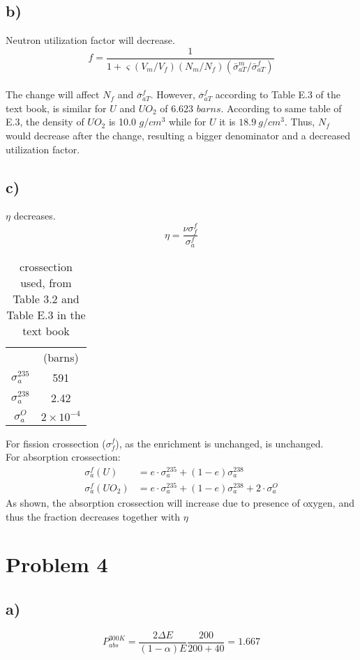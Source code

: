 \documentclass{article}
\begin{document}
\subsection*{b)}
Neutron utilization factor will decrease.
\[f = \frac{1}{1+\varsigma (V_m/V_f)(N_m/N_f)(\bar{\sigma}_{aT}^m/\bar{\sigma}_{aT}^f)}\]\\
The change will affect \(N_f\) and \(\overline{\sigma}^f_{aT}\). However, \(\overline{\sigma}^f_{aT}\) according to Table E.3 of the text book, is similar for 
\(U\) and \(UO_2\) of 6.623 \(barns\). According to same table of E.3, the density of \(UO_2\) is 10.0 \(g/cm^3\) while for \(U\) it is \(18.9\ g/cm^3\). Thus, \(N_f\)
would decrease after the change, resulting a bigger denominator and a decreased utilization factor.
\newpage
\subsection*{c)}
\(\eta\) decreases.
\[\eta =\frac{\nu\sigma^f_f}{\sigma^f_a}\]
\begin{table*}[h]
    \caption*{crossection used, from Table 3.2 and Table E.3 in the text book}
    \centering
    \begin{tabular}{c c}
        \hline \hline
        &(barns)\\
        \(\sigma_a^{235}\)& 591\\
        \(\sigma_a^{238}\)& 2.42\\
        \(\sigma_a^O\)& \(2\times 10^{-4}\)\\
        \hline \hline
    \end{tabular}
\end{table*}

For fission crossection (\(\sigma_f^f\)), as the enrichment is unchanged, is unchanged.\\
For absorption crossection:
\begin{align*}
    \sigma_a^f(U)&=e \cdot \sigma_a^{235}+(1-e)\sigma_a^{238}\\
    \sigma_a^f(UO_2)&=e \cdot \sigma_a^{235}+(1-e)\sigma_a^{238}+2\cdot \sigma_a^O
\end{align*}
As shown, the absorption crossection will increase due to presence of oxygen, and thus the fraction decreases together with \(\eta\)
\section*{Problem 4}
\subsection*{a)}
\[P_{abs}^{300K}=\frac{2\Delta E}{(1-\alpha)E}\frac{200}{200+40}=1.667\]
\end{document}
